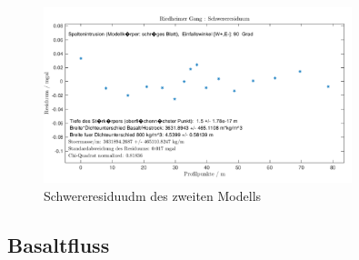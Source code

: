 \begin{figure}[!ht]
 \centering
 \includegraphics[width=0.8\textwidth]{fig/modell2_res}
 \caption{Schwereresiduudm des zweiten Modells}
 \label{fig:modell2_res}
\end{figure}

\subsection{Basaltfluss}



